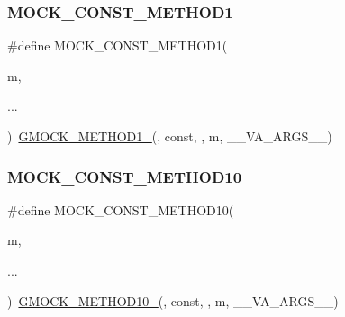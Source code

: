 \mbox{\label{_obj__test_2lib_2googletest-release-1_88_81_2googlemock_2include_2gmock_2gmock-generated-function-mockers_8h_a6f76aeb56f492cfe538e177b6aa77965}} 
\subsubsection{\texorpdfstring{MOCK\_CONST\_METHOD1}{MOCK\_CONST\_METHOD1}}
{\footnotesize\ttfamily \#define M\+O\+C\+K\+\_\+\+C\+O\+N\+S\+T\+\_\+\+M\+E\+T\+H\+O\+D1(\begin{DoxyParamCaption}\item[{}]{m,  }\item[{}]{... }\end{DoxyParamCaption})~\mbox{\hyperlink{_obj__test_2lib_2googletest-release-1_88_81_2googlemock_2include_2gmock_2gmock-generated-function-mockers_8h_a1bc0012d62440dda77208dabdf4925c9}{G\+M\+O\+C\+K\+\_\+\+M\+E\+T\+H\+O\+D1\+\_\+}}(, const, , m, \+\_\+\+\_\+\+V\+A\+\_\+\+A\+R\+G\+S\+\_\+\+\_\+)}

\mbox{\label{_obj__test_2lib_2googletest-release-1_88_81_2googlemock_2include_2gmock_2gmock-generated-function-mockers_8h_a4f16ede0ef660fb6dc49e5f5d226fbf9}} 
\subsubsection{\texorpdfstring{MOCK\_CONST\_METHOD10}{MOCK\_CONST\_METHOD10}}
{\footnotesize\ttfamily \#define M\+O\+C\+K\+\_\+\+C\+O\+N\+S\+T\+\_\+\+M\+E\+T\+H\+O\+D10(\begin{DoxyParamCaption}\item[{}]{m,  }\item[{}]{... }\end{DoxyParamCaption})~\mbox{\hyperlink{_obj__test_2lib_2googletest-release-1_88_81_2googlemock_2include_2gmock_2gmock-generated-function-mockers_8h_a81a48223a8771de36ef92ac6d56f6e81}{G\+M\+O\+C\+K\+\_\+\+M\+E\+T\+H\+O\+D10\+\_\+}}(, const, , m, \+\_\+\+\_\+\+V\+A\+\_\+\+A\+R\+G\+S\+\_\+\+\_\+)}

